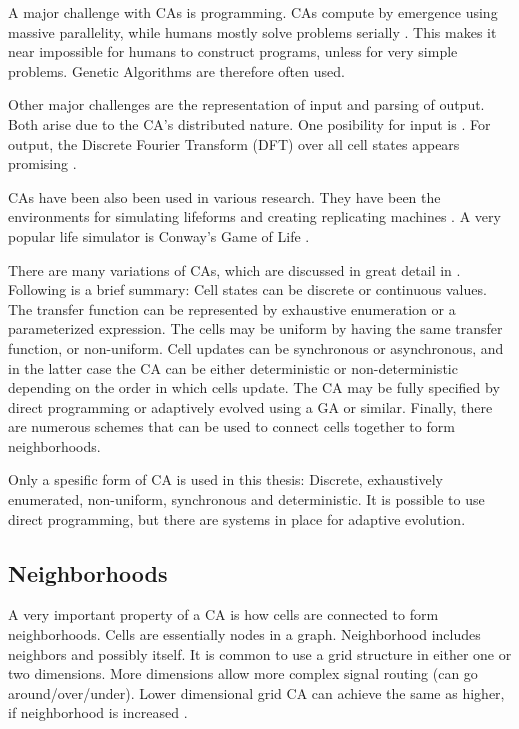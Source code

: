 A major challenge with CAs is programming.
CAs compute by emergence using massive parallelity, while humans mostly solve problems serially \cite{newell1972problemsolving}.
This makes it near impossible for humans to construct programs, unless for very simple problems.
Genetic Algorithms are therefore often used.

Other major challenges are the representation of input and parsing of output.
Both arise due to the CA's distributed nature.
One posibility for input is \TODO.
For output, the Discrete Fourier Transform (DFT) over all cell states appears promising \cite{berg2013ca}.

CAs have been also been used in various research.
They have been the environments for simulating lifeforms and creating replicating machines \cite{neumann1966selfreplication}.
A very popular life simulator is Conway's Game of Life \cite{gardner1970life}.

There are many variations of CAs, which are discussed in great detail in \cite{sipper1999emergence}.
Following is a brief summary:
Cell states can be discrete or continuous values.
The transfer function can be represented by exhaustive enumeration or a parameterized expression.
The cells may be uniform by having the same transfer function, or non-uniform.
Cell updates can be synchronous or asynchronous, and in the latter case the CA can be either deterministic or non-deterministic depending on the order in which cells update.
The CA may be fully specified by direct programming or adaptively evolved using a GA or similar.
Finally, there are numerous schemes that can be used to connect cells together to form neighborhoods.

Only a spesific form of CA is used in this thesis:
Discrete, exhaustively enumerated, non-uniform, synchronous and deterministic.
It is possible to use direct programming, but there are systems in place for adaptive evolution.

\subsection{Neighborhoods}

A very important property of a CA is how cells are connected to form neighborhoods.
Cells are essentially nodes in a graph.
Neighborhood includes neighbors and possibly itself.
It is common to use a grid structure in either one or two dimensions.
More dimensions allow more complex signal routing (can go around/over/under).
Lower dimensional grid CA can achieve the same as higher, if neighborhood is increased \CN.

